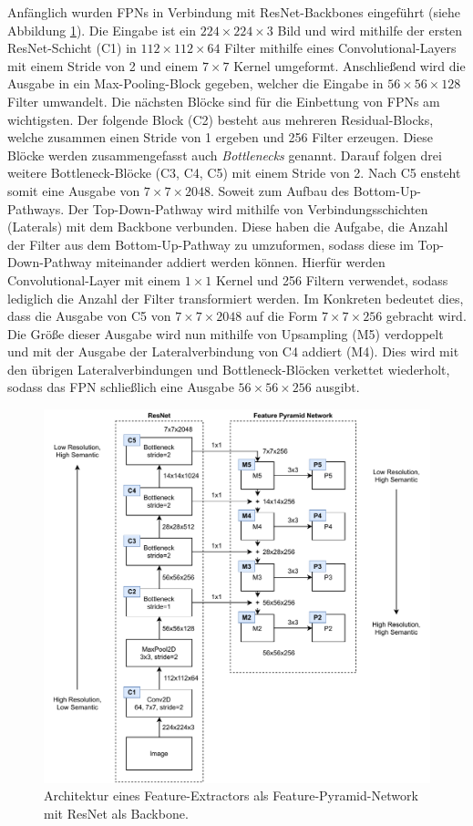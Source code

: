 Anfänglich wurden FPNs in Verbindung mit ResNet-Backbones eingeführt (siehe
Abbildung \ref{fig:resnet-fpn}). Die Eingabe ist ein $224 \times 224 \times 3$
Bild und wird mithilfe der ersten ResNet-Schicht (C1) in $112 \times 112 \times
64$ Filter mithilfe eines Convolutional-Layers mit einem Stride von 2 und einem
$7 \times 7$ Kernel umgeformt. Anschließend wird die Ausgabe in ein
Max-Pooling-Block gegeben, welcher die Eingabe in $56 \times 56 \times 128$
Filter umwandelt. Die nächsten Blöcke sind für die Einbettung von FPNs am
wichtigsten. Der folgende Block (C2) besteht aus mehreren Residual-Blocks,
welche zusammen einen Stride von 1 ergeben und 256 Filter erzeugen. Diese Blöcke
werden zusammengefasst auch \textit{Bottlenecks} genannt. Darauf folgen drei
weitere Bottleneck-Blöcke (C3, C4, C5) mit einem Stride von 2. Nach C5 ensteht
somit eine Ausgabe von $7 \times 7 \times 2048$. Soweit zum Aufbau des
Bottom-Up-Pathways. Der Top-Down-Pathway wird mithilfe von Verbindungsschichten
(Laterals) mit dem Backbone verbunden. Diese haben die Aufgabe, die Anzahl der
Filter aus dem Bottom-Up-Pathway zu umzuformen, sodass diese im Top-Down-Pathway
miteinander addiert werden können. Hierfür werden Convolutional-Layer mit einem
$1 \times 1$ Kernel und 256 Filtern verwendet, sodass lediglich die Anzahl der
Filter transformiert werden. Im Konkreten bedeutet dies, dass die Ausgabe von C5
von $7 \times 7 \times 2048$ auf die Form $7 \times 7 \times 256$ gebracht wird.
Die Größe dieser Ausgabe wird nun mithilfe von Upsampling (M5) verdoppelt und
mit der Ausgabe der Lateralverbindung von C4 addiert (M4). Dies wird mit den übrigen Lateralverbindungen und Bottleneck-Blöcken verkettet wiederholt, sodass das FPN schließlich eine Ausgabe $56 \times 56 \times 256$ ausgibt. 

\begin{figure}
    \includegraphics[width=\textwidth]{images/ResNet_FPN.pdf}
    \caption{Architektur eines Feature-Extractors als Feature-Pyramid-Network
    mit ResNet als Backbone.}
    \label{fig:resnet-fpn}
\end{figure}